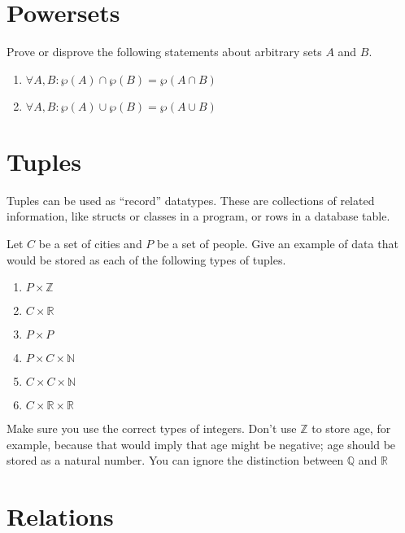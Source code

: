 \documentclass{article}
\begin{document}
\section{Powersets}

Prove or disprove the following statements about arbitrary sets $A$ and $B$.

\begin{enumerate}[label=\textbf{\alph*.}]
    \item $\forall A, B : \wp(A) \cap \wp(B) = \wp(A \cap B)$
    \item $\forall A, B : \wp(A) \cup \wp(B) = \wp(A \cup B)$
\end{enumerate}

\pagebreak
\section{Tuples}

Tuples can be used as ``record'' datatypes.
These are collections of related information, like structs or classes in a program, or rows in a database table.

Let $C$ be a set of cities and $P$ be a set of people.
Give an example of data that would be stored as each of the following types of tuples.

\begin{multicols}{3}
\begin{enumerate}[label=\textbf{\alph*.}]
    \item $P \times \mathbb{Z}$
    \item $C \times \mathbb{R}$
    \item $P \times P$
    \item $P \times C \times \mathbb{N}$
    \item $C \times C \times \mathbb{N}$
    \item $C \times \mathbb{R} \times \mathbb{R}$
\end{enumerate}
\end{multicols}

\noindent
Make sure you use the correct types of integers.
Don't use $\mathbb{Z}$ to store age, for example, because that would imply that age might be negative; age should be stored as a natural number.
You can ignore the distinction between $\mathbb{Q}$ and $\mathbb{R}$


\section{Relations}
\end{document}
